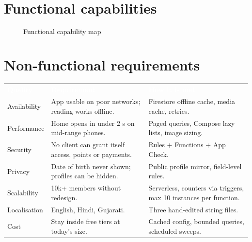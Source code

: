 \documentclass[11pt,a4paper,oneside]{report}
\newcommand{\thead}[1]{\textcolor{white}{\bfseries #1}}
\newcommand{\headrow}{\rowcolor{ojDeep}}
\begin{document}
\section{Functional capabilities}
\begin{figure}[H]
\centering
{}
\caption{Functional capability map}
\end{figure}

\section{Non-functional requirements}
\begin{tabularx}{\textwidth}{@{}p{3.1cm}L p{3.6cm}@{}}
\headrow \thead{Quality} & \thead{Requirement} & \thead{How it is met} \\
Availability & App usable on poor networks; reading works offline. & Firestore offline cache, media cache, retries. \\
Performance & Home opens in under 2 s on mid-range phones. & Paged queries, Compose lazy lists, image sizing. \\
Security & No client can grant itself access, points or payments. & Rules + Functions + App Check. \\
Privacy & Date of birth never shown; profiles can be hidden. & Public profile mirror, field-level rules. \\
Scalability & 10k+ members without redesign. & Serverless, counters via triggers, max 10 instances per function. \\
Localisation & English, Hindi, Gujarati. & Three hand-edited string files. \\
Cost & Stay inside free tiers at today's size. & Cached config, bounded queries, scheduled sweeps. \\
\bottomrule
\end{tabularx}
\end{document}
